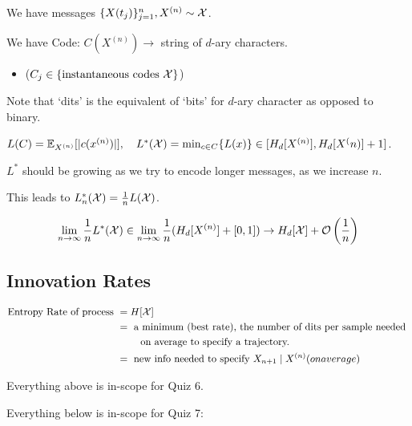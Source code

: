 We have messages $\{X(t_j)\}_{j=1}^n, X^{(n)}\sim \mathcal{X}$.

We have Code: $C(X^{(n)})\to$ string of $d$-ary characters.
\begin{itemize}
    \item ($C_j\in \{\text{instantaneous codes $\mathcal{X}$}\}$)
\end{itemize}
Note that `dits' is the equivalent of `bits' for $d$-ary character as opposed to binary.

$L(C)=\mathbb{E}_{X^{(n)}}[|c(x^{(n)})|], \quad L^*(\mathcal{X})=\min_{c\in C}\{L(x)\}\in [H_d[X^{(n)}], H_d[X^(n)] + 1]$.

$L^*$ should be growing as we try to encode longer messages, as we increase $n$.

This leads to $L_n^*(\mathcal{X}) = \frac1n L(\mathcal{X})$.

$$\lim_{n\to\infty} \frac1n L^*(\mathcal{X})\in\lim_{n\to\infty} \frac1n(H_d[X^{(n)}] + [0, 1]) \to H_d[\mathcal{X}] + \mathcal{O}\left(\frac1n\right)$$

\subsection{Innovation Rates}
\begin{align*}
\text{Entropy Rate of process } 
&= H[\mathcal{X}] 
\\
&= \text{ a minimum (best rate), the number of dits per sample needed 
}
\\
&
\quad\quad
\text{
on average to specify a trajectory.}\\
&= \text{ new info needed to specify $X_{n+1}\mid X^{(n)}$} (on average)
\end{align*}

Everything above is in-scope for Quiz 6.

\hrulefill

Everything below is in-scope for Quiz 7:
